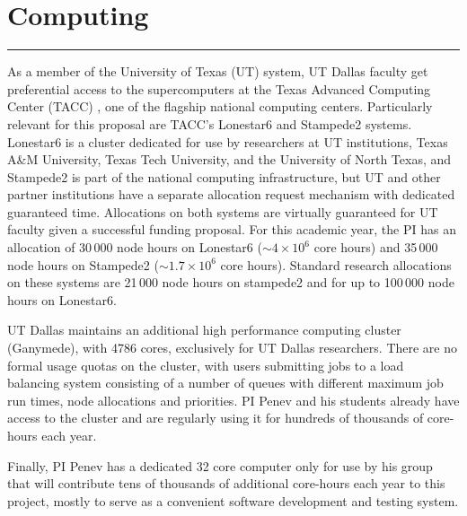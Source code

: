 \section*{}

\section*{Computing}
%
\hrule \vspace{0.5mm}

As a member of the University of Texas (UT) system, UT Dallas faculty get
preferential access to the supercomputers at the Texas Advanced Computing Center
(TACC) \citep{tacc_22}, one of the flagship national computing centers.
Particularly relevant for this proposal are TACC's Lonestar6
\citep{lonestar6_22} and Stampede2 \citep{stampede2_22} systems. Lonestar6 is a
cluster dedicated for use by researchers at UT institutions, Texas A\&M
University, Texas Tech University, and the University of North Texas, and
Stampede2 is part of the national computing infrastructure, but UT and other
partner institutions have a separate allocation request mechanism with dedicated
guaranteed time. Allocations on both systems are virtually guaranteed for UT
faculty given a successful funding proposal. For this academic year, the PI has
an allocation of 30\,000 node hours on Lonestar6 ($\sim 4 \times 10^6$ core
hours) and 35\,000 node hours on Stampede2 ($\sim 1.7 \times 10^6$ core hours).
Standard research allocations on these systems are 21\,000 node hours on
stampede2 and for up to 100\,000 node hours on Lonestar6.

UT Dallas maintains an additional high performance computing cluster
(Ganymede)\citep{ganymede_22}, with 4786 cores, exclusively for UT Dallas
researchers.  There are no formal usage quotas on the cluster, with users
submitting jobs to a load balancing system consisting of a number of queues with
different maximum job run times, node allocations and priorities. PI Penev and
his students already have access to the cluster and are regularly using it for
hundreds of thousands of core-hours each year.

Finally, PI Penev has a dedicated 32 core computer only for use by his group
that will contribute tens of thousands of additional core-hours each year to this
project, mostly to serve as a convenient software development and testing
system.

